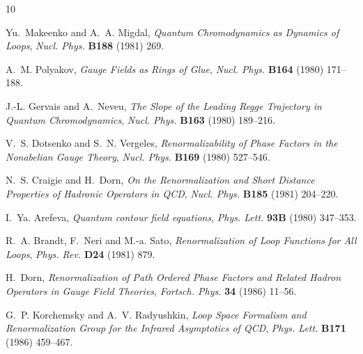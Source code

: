 \documentclass[12pt]{article}
\numberwithin{equation}{section}
\newcommand{\1}[1]{\mathbf{1}^{#1}}
\newcommand{\2}[1]{\mathbf{2}^{#1}}
\newcommand{\3}[1]{\mathbf{3}^{#1}}
\newcommand{\4}[1]{\mathbf{4}^{#1}}
\newcommand{\5}[1]{\mathbf{5}^{#1}}
\begin{document}
\providecommand{\href}[2]{#2}\begingroup\raggedright\begin{thebibliography}{10}

{\relax Yu}.~Makeenko and A.~A. Migdal, \emph{{Quantum Chromodynamics as
  Dynamics of Loops}},
  \href{http://dx.doi.org/10.1016/0550-3213(81)90258-3}{\emph{Nucl. Phys.}
  {\bfseries B188} (1981) 269}.

A.~M. Polyakov, \emph{{Gauge Fields as Rings of Glue}},
  \href{http://dx.doi.org/10.1016/0550-3213(80)90507-6}{\emph{Nucl. Phys.}
  {\bfseries B164} (1980) 171--188}.

J.-L. Gervais and A.~Neveu, \emph{{The Slope of the Leading Regge Trajectory in
  Quantum Chromodynamics}},
  \href{http://dx.doi.org/10.1016/0550-3213(80)90397-1}{\emph{Nucl. Phys.}
  {\bfseries B163} (1980) 189--216}.

V.~S. Dotsenko and S.~N. Vergeles, \emph{{Renormalizability of Phase Factors in
  the Nonabelian Gauge Theory}},
  \href{http://dx.doi.org/10.1016/0550-3213(80)90103-0}{\emph{Nucl. Phys.}
  {\bfseries B169} (1980) 527--546}.

N.~S. Craigie and H.~Dorn, \emph{{On the Renormalization and Short Distance
  Properties of Hadronic Operators in {QCD}}},
  \href{http://dx.doi.org/10.1016/0550-3213(81)90372-2}{\emph{Nucl. Phys.}
  {\bfseries B185} (1981) 204--220}.

I.~{\relax Ya}. Arefeva, \emph{{Quantum contour field equations}},
  \href{http://dx.doi.org/10.1016/0370-2693(80)90529-8}{\emph{Phys. Lett.}
  {\bfseries 93B} (1980) 347--353}.

R.~A. Brandt, F.~Neri and M.-a. Sato, \emph{{Renormalization of Loop Functions
  for All Loops}}, \href{http://dx.doi.org/10.1103/PhysRevD.24.879}{\emph{Phys.
  Rev.} {\bfseries D24} (1981) 879}.

H.~Dorn, \emph{{Renormalization of Path Ordered Phase Factors and Related
  Hadron Operators in Gauge Field Theories}},
  \href{http://dx.doi.org/10.1002/prop.19860340104}{\emph{Fortsch. Phys.}
  {\bfseries 34} (1986) 11--56}.

G.~P. Korchemsky and A.~V. Radyushkin, \emph{{Loop Space Formalism and
  Renormalization Group for the Infrared Asymptotics of {QCD}}},
  \href{http://dx.doi.org/10.1016/0370-2693(86)91439-5}{\emph{Phys. Lett.}
  {\bfseries B171} (1986) 459--467}.


\end{thebibliography}
\end{document}
